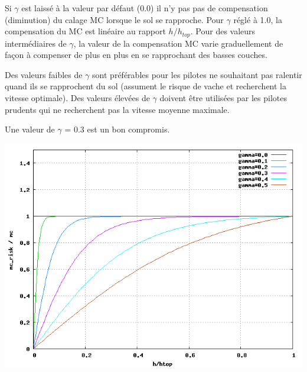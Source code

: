 Si  $\gamma$  est laissé à la valeur par défaut (0.0) il n'y pas pas de compensation (diminution) du calage MC lorsque le sol se rapproche. Pour  $\gamma$  réglé à 1.0, la compensation du MC est linéaire au rapport   $h/h_{top}$. Pour des valeurs intermédiaires de  $\gamma$, la valeur de la compensation MC varie graduellement de façon à compenser de plus en plus en se rapprochant des basses couches.

Des valeurs faibles de  $\gamma$  sont préférables pour les pilotes ne souhaitant pas ralentir quand ils se rapprochent du sol (assument le risque de vache et recherchent la vitesse optimale). Des valeurs élevées de  $\gamma$  doivent être utilisées par les pilotes prudents qui ne recherchent pas la vitesse moyenne maximale.

Une valeur de  $\gamma$  = 0.3 est un bon compromis.

\begin{center}
\includegraphics[angle=0,width=0.9\linewidth,keepaspectratio='true']{figures/riskmc.png}
\end{center}

